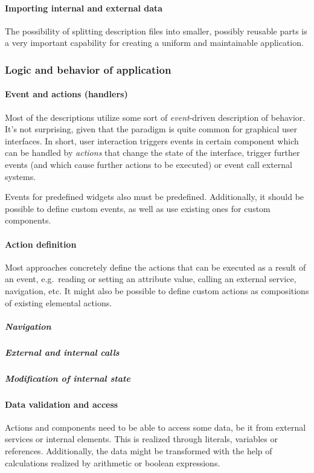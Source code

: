 \paragraph{Importing internal and external data}
 The possibility of splitting description files into smaller, possibly reusable parts is a very important capability for creating a uniform and maintainable application.

\subsubsection{Logic and behavior of application}

\paragraph{Event and actions (handlers)}
 Most of the descriptions utilize some sort of \emph{event}-driven description of behavior.
 It's not surprising, given that the paradigm is quite common for graphical user interfaces.
In short, user interaction triggers events in certain component which can be handled by \emph{actions} that change the state of the interface, trigger further events (and which cause further actions to be executed) or event call external systems.

Events for predefined widgets also must be predefined.
Additionally, it should be possible to define custom events, as well as use existing ones for custom components.

\paragraph{Action definition}
Most approaches concretely define the actions that can be executed as a result of an event, e.g.\ reading or setting an attribute value, calling an external service, navigation, etc.
 It might also be possible to define custom actions as compositions of existing elemental actions.

\subparagraph{Navigation}

\subparagraph{External and internal calls}

\subparagraph{Modification of internal state}

\paragraph{Data validation and access}
Actions and components need to be able to access some data, be it from external services or internal elements.
This is realized through literals, variables or references.
Additionally, the data might be transformed with the help of calculations realized by arithmetic or boolean expressions.

